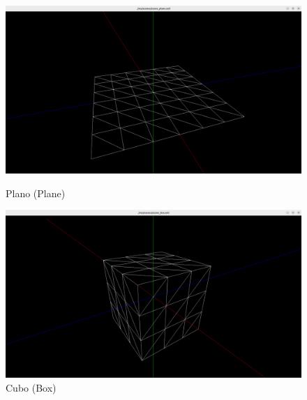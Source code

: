 \documentclass[12pt, a4paper]{article}
\begin{document}
\begin{figure}[h]
    \centering
    \begin{minipage}{0.48\textwidth}
        \centering
        \includegraphics[width=\textwidth]{res/results/Plane.png}
        \caption{Plano (Plane)}
        \label{fig:imagePlane}
    \end{minipage}\hfill
    \begin{minipage}{0.48\textwidth}
        \centering
        \includegraphics[width=\textwidth]{res/results/Box.png}
        \caption{Cubo (Box)}
        \label{fig:imageBox}
    \end{minipage}
\end{figure}
\end{document}
